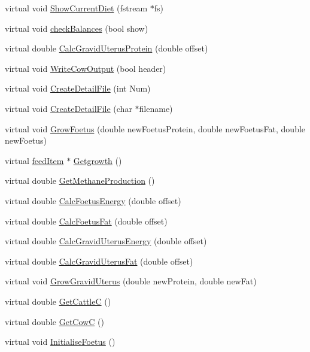 \begin{DoxyCompactItemize}
virtual void \hyperlink{classcattle_ac747b39751d40739d2b1c00246e65c7d}{ShowCurrentDiet} (fstream $\ast$fs)
\item 
virtual void \hyperlink{classcattle_a583babf76f49e8ab7dab411195bcda2e}{checkBalances} (bool show)
\item 
virtual double \hyperlink{classcattle_ababba75682af1059250b4a92eedd4a64}{CalcGravidUterusProtein} (double offset)
\item 
virtual void \hyperlink{classcattle_a66a96c0c6ec89204ed6b11b8393f8014}{WriteCowOutput} (bool header)
\item 
virtual void \hyperlink{classcattle_a3d331307509c0f26ab8ae6b2f890f889}{CreateDetailFile} (int Num)
\item 
virtual void \hyperlink{classcattle_a046831ac9ac76d46a2fc281301d07469}{CreateDetailFile} (char $\ast$filename)
\item 
virtual void \hyperlink{classcattle_a19fcd794dfdaba6c37698d04a5056423}{GrowFoetus} (double newFoetusProtein, double newFoetusFat, double newFoetus)
\item 
virtual \hyperlink{classfeed_item}{feedItem} $\ast$ \hyperlink{classcattle_a31cf342857dea26371d0da77baec3b99}{Getgrowth} ()
\item 
virtual double \hyperlink{classcattle_a8053c5118595709cf95a6e54b2560024}{GetMethaneProduction} ()
\item 
virtual double \hyperlink{classcattle_ab26f4af3dee792b5979ef58083c46f58}{CalcFoetusEnergy} (double offset)
\item 
virtual double \hyperlink{classcattle_ad24d13fc2005a194019309ce8f47f7d2}{CalcFoetusFat} (double offset)
\item 
virtual double \hyperlink{classcattle_a2b592878b7c6d87baff5414c008e9015}{CalcGravidUterusEnergy} (double offset)
\item 
virtual double \hyperlink{classcattle_a795f803883c77aae60e3c722fed59e6d}{CalcGravidUterusFat} (double offset)
\item 
virtual void \hyperlink{classcattle_a4998e90c175bd1e1aa4b57fcfcc5b281}{GrowGravidUterus} (double newProtein, double newFat)
\item 
virtual double \hyperlink{classcattle_a68445d9f0e164038d9046facfe259610}{GetCattleC} ()
\item 
virtual double \hyperlink{classcattle_a01c489501d6d56cb3af7bd22e266bd1f}{GetCowC} ()
\item 
virtual void \hyperlink{classcattle_ab41b2206b12b2f5bd16dd817960315bd}{InitialiseFoetus} ()
\item 

\end{DoxyCompactItemize}
